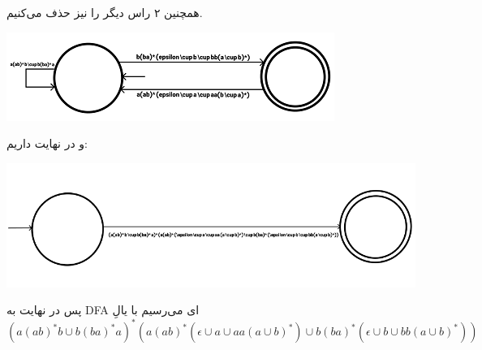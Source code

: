 همچنین ۲ راس دیگر را نیز حذف می‌کنیم.

\begin{center}
	\includegraphics{DFA22}
\end{center}

و در نهایت داریم:

\begin{center}
	\includegraphics{DFA23}
\end{center}

پس در نهایت به DFA ای می‌رسیم با یالِ
$$
(a(ab)^* b \cup b(ba)^* a)^* (a(ab)^* (\epsilon \cup a \cup aa (a \cup b)^*) \cup b(ba)^* (\epsilon \cup b \cup bb(a \cup b)^*))
$$
